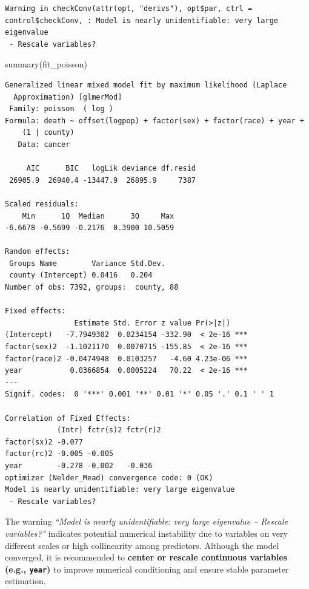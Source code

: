 \documentclass[
  letterpaper,
  DIV=11,
  numbers=noendperiod]{scrreprt}
\newenvironment{Shaded}{\begin{snugshade}}{\end{snugshade}}
\newcommand{\FunctionTok}[1]{\textcolor[rgb]{0.28,0.35,0.67}{#1}}
\newcommand{\NormalTok}[1]{\textcolor[rgb]{0.00,0.23,0.31}{#1}}
\begin{document}
\begin{verbatim}
Warning in checkConv(attr(opt, "derivs"), opt$par, ctrl = control$checkConv, : Model is nearly unidentifiable: very large eigenvalue
 - Rescale variables?
\end{verbatim}

\begin{Shaded}
\begin{Highlighting}[]
\FunctionTok{summary}\NormalTok{(fit\_poisson)}
\end{Highlighting}
\end{Shaded}

\begin{verbatim}
Generalized linear mixed model fit by maximum likelihood (Laplace
  Approximation) [glmerMod]
 Family: poisson  ( log )
Formula: death ~ offset(logpop) + factor(sex) + factor(race) + year +  
    (1 | county)
   Data: cancer

     AIC      BIC   logLik deviance df.resid 
 26905.9  26940.4 -13447.9  26895.9     7387 

Scaled residuals: 
    Min      1Q  Median      3Q     Max 
-6.6678 -0.5699 -0.2176  0.3900 10.5059 

Random effects:
 Groups Name        Variance Std.Dev.
 county (Intercept) 0.0416   0.204   
Number of obs: 7392, groups:  county, 88

Fixed effects:
                Estimate Std. Error z value Pr(>|z|)    
(Intercept)   -7.7949302  0.0234154 -332.90  < 2e-16 ***
factor(sex)2  -1.1021170  0.0070715 -155.85  < 2e-16 ***
factor(race)2 -0.0474948  0.0103257   -4.60 4.23e-06 ***
year           0.0366854  0.0005224   70.22  < 2e-16 ***
---
Signif. codes:  0 '***' 0.001 '**' 0.01 '*' 0.05 '.' 0.1 ' ' 1

Correlation of Fixed Effects:
            (Intr) fctr(s)2 fctr(r)2
factor(sx)2 -0.077                  
factor(rc)2 -0.005 -0.005           
year        -0.278 -0.002   -0.036  
optimizer (Nelder_Mead) convergence code: 0 (OK)
Model is nearly unidentifiable: very large eigenvalue
 - Rescale variables?
\end{verbatim}

The warning \emph{``Model is nearly unidentifiable: very large
eigenvalue -- Rescale variables?''} indicates potential numerical
instability due to variables on very different scales or high
collinearity among predictors. Although the model converged, it is
recommended to \textbf{center or rescale continuous variables (e.g.,
\texttt{year})} to improve numerical conditioning and ensure stable
parameter estimation.
\end{document}

